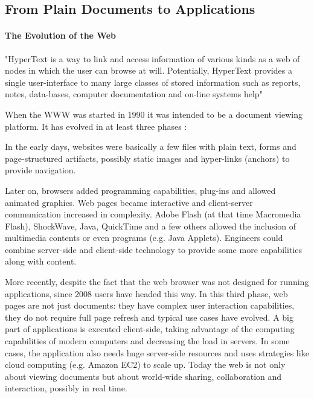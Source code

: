 
%
%

\subsection{From Plain Documents to Applications}
\paragraph{The Evolution of the Web}
"HyperText is a way to link and access information of various kinds as a web of nodes in which the user can browse at will. Potentially, HyperText provides a single user-interface to many large classes of stored information such as reports, notes, data-bases, computer documentation and on-line systems help" \cite{BernersLee:1990}

When the \ac{WWW} was started in 1990 it was intended to be a document viewing platform.
It has evolved in at least three phases \cite{Anttonen:2011} \cite{Taivalsaari:2008}:

In the early days, websites were basically a few files with plain text, forms and page-structured artifacts, possibly static images and hyper-links (anchors) to provide navigation. 

Later on, browsers added programming capabilities, plug-ins and allowed animated graphics. Web pages became interactive and client-server communication increased in complexity.
Adobe Flash (at that time Macromedia Flash), ShockWave, Java, QuickTime and a few others allowed the inclusion of multimedia contents or even programs (e.g. Java Applets).
Engineers could combine server-side and client-side technology to provide some more capabilities along with content.

More recently, despite the fact that the web browser was not designed for running applications, since 2008 users have headed this way. 
In this third phase, web pages are not just documents: they have complex user interaction capabilities, they do not require full page refresh and typical use cases have evolved. 
A big part of applications is executed client-side, taking advantage of the computing capabilities of modern computers and decreasing the load in servers. In some cases, the application also needs huge server-side resources and uses strategies like cloud computing (e.g. Amazon EC2) to scale up.
Today the web is not only about viewing documents but about world-wide sharing, collaboration and interaction, possibly in real time. 

